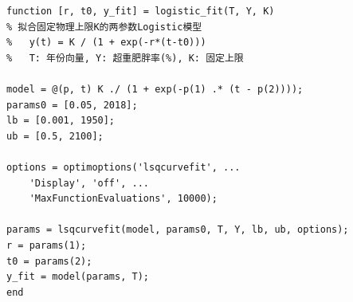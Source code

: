 \begin{lstlisting}[caption={logistic\_fit.m：两参数Logistic拟合}]
function [r, t0, y_fit] = logistic_fit(T, Y, K)
% 拟合固定物理上限K的两参数Logistic模型
%   y(t) = K / (1 + exp(-r*(t-t0)))
%   T: 年份向量, Y: 超重肥胖率(%), K: 固定上限

model = @(p, t) K ./ (1 + exp(-p(1) .* (t - p(2))));
params0 = [0.05, 2018];
lb = [0.001, 1950];
ub = [0.5, 2100];

options = optimoptions('lsqcurvefit', ...
    'Display', 'off', ...
    'MaxFunctionEvaluations', 10000);

params = lsqcurvefit(model, params0, T, Y, lb, ub, options);
r = params(1);
t0 = params(2);
y_fit = model(params, T);
end
\end{lstlisting}

